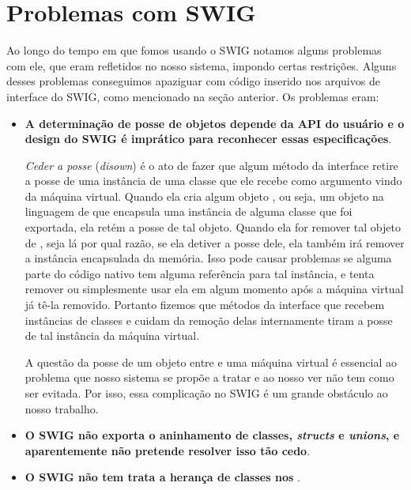   
  \section{Problemas com SWIG}
  \label{cap:atividades:swig-sux}
  Ao longo do tempo em que fomos usando o SWIG notamos alguns problemas com ele, que eram
  refletidos no nosso sistema, impondo certas restrições. Alguns desses problemas conseguimos
  apaziguar com código inserido nos arquivos de interface do SWIG, como mencionado na seção
  anterior. Os problemas eram:
  
  \begin{itemize}
    \item \textbf{A determinação de posse de objetos depende da API do usuário e o design do SWIG é
      imprático para reconhecer essas especificações}.
      
      \textit{Ceder a posse} (\textit{disown}) é o ato de fazer que algum método da interface \CXX{}
      retire a posse de uma instância de uma classe \CXX{} que ele recebe como argumento vindo da
      máquina virtual. Quando ela cria algum objeto \CXX{}, ou seja, um objeto na linguagem de 
      \script{} que encapsula uma instância de alguma classe \CXX{} que foi exportada, ela
      retém a posse de tal objeto. Quando ela for remover tal objeto de \script{}, seja 
      lá por qual razão, se ela detiver a posse dele, ela também irá remover a instância 
      \CXX{} encapsulada da memória. Isso pode causar problemas se alguma parte do código nativo
      tem alguma referência para tal instância, e tenta remover ou simplesmente usar ela em algum
      momento após a máquina virtual já tê-la removido. Portanto fizemos que métodos
      da interface \CXX{} que recebem instâncias de classes e cuidam da remoção delas 
      internamente tiram a posse de tal instância da máquina virtual.
      
      A questão da posse de um objeto entre \CXX{} e uma máquina virtual é essencial ao
      problema que nosso sistema se propõe a tratar e ao nosso ver não tem como ser evitada.
      Por isso, essa complicação no SWIG é um grande obstáculo ao nosso trabalho.

    \item \textbf{O SWIG não exporta o aninhamento\footnotemark{} de classes, \textit{structs} e \textit{unions}, e 
      aparentemente não pretende resolver isso tão cedo}.
      
    \item \textbf{O SWIG não tem trata a herança de classes \CXX{} nos }.
      

\end{itemize}
